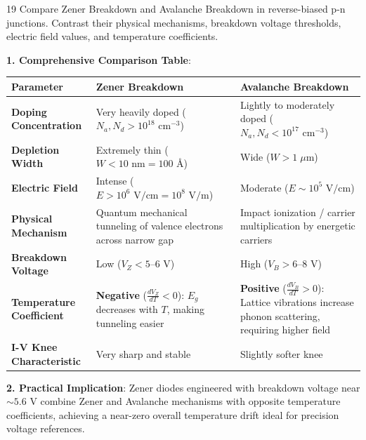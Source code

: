 \begin{theoryq}{19}
Compare Zener Breakdown and Avalanche Breakdown in reverse-biased p-n junctions. Contrast their physical mechanisms, breakdown voltage thresholds, electric field values, and temperature coefficients.
\end{theoryq}
\begin{theorysol}
\textbf{1. Comprehensive Comparison Table}:
\begin{center}
\begin{tabularx}{\textwidth}{|l|X|X|}
\hline
\textbf{Parameter} & \textbf{Zener Breakdown} & \textbf{Avalanche Breakdown} \\
\hline
\textbf{Doping Concentration} & Very heavily doped ($N_a, N_d > 10^{18}\text{ cm}^{-3}$) & Lightly to moderately doped ($N_a, N_d < 10^{17}\text{ cm}^{-3}$) \\
\textbf{Depletion Width} & Extremely thin ($W < 10\text{ nm} = 100\text{ \AA}$) & Wide ($W > 1\;\mu\text{m}$) \\
\textbf{Electric Field} & Intense ($E > 10^6\text{ V/cm} = 10^8\text{ V/m}$) & Moderate ($E \sim 10^5\text{ V/cm}$) \\
\textbf{Physical Mechanism} & Quantum mechanical tunneling of valence electrons across narrow gap & Impact ionization / carrier multiplication by energetic carriers \\
\textbf{Breakdown Voltage} & Low ($V_Z < 5\text{--}6\text{ V}$) & High ($V_B > 6\text{--}8\text{ V}$) \\
\textbf{Temperature Coefficient} & \textbf{Negative} ($\frac{dV_Z}{dT} < 0$): $E_g$ decreases with $T$, making tunneling easier & \textbf{Positive} ($\frac{dV_B}{dT} > 0$): Lattice vibrations increase phonon scattering, requiring higher field \\
\textbf{I-V Knee Characteristic} & Very sharp and stable & Slightly softer knee \\
\hline
\end{tabularx}
\end{center}

\textbf{2. Practical Implication}:
Zener diodes engineered with breakdown voltage near $\sim 5.6\text{ V}$ combine Zener and Avalanche mechanisms with opposite temperature coefficients, achieving a near-zero overall temperature drift ideal for precision voltage references.
\end{theorysol}
\vspace{4mm}

